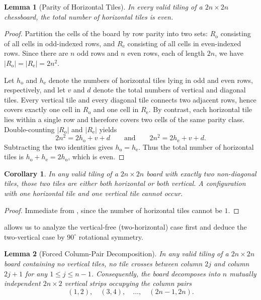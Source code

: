 \documentclass[11pt,a4paper]{article}
\theoremstyle{paperthm}
\newtheorem{lemma}{Lemma}
\newtheorem{corollary}{Corollary}
\theoremstyle{paperdef}
\begin{document}
\begin{lemma}[Parity of Horizontal Tiles]
  \label{lem:parity}
  In every valid tiling of a $2n \times 2n$ chessboard, the total number of horizontal tiles is even.
\end{lemma}

\begin{proof}
  Partition the cells of the board by row parity into two sets: $R_{\mathrm{o}}$ consisting of all cells in odd-indexed rows, and $R_{\mathrm{e}}$ consisting of all cells in even-indexed rows. Since there are $n$ odd rows and $n$ even rows, each of length $2n$, we have $|R_{\mathrm{o}}| = |R_{\mathrm{e}}| = 2n^2$.

  Let $h_{\mathrm{o}}$ and $h_{\mathrm{e}}$ denote the numbers of horizontal tiles lying in odd and even rows, respectively, and let $v$ and $d$ denote the total numbers of vertical and diagonal tiles. Every vertical tile and every diagonal tile connects two adjacent rows, hence covers exactly one cell in $R_{\mathrm{o}}$ and one cell in $R_{\mathrm{e}}$. By contrast, each horizontal tile lies within a single row and therefore covers two cells of the same parity class. Double-counting $|R_{\mathrm{o}}|$ and $|R_{\mathrm{e}}|$ yields
  \[
    2n^2 = 2h_{\mathrm{o}} + v + d
    \qquad\text{and}\qquad
    2n^2 = 2h_{\mathrm{e}} + v + d.
  \]
  Subtracting the two identities gives $h_{\mathrm{o}} = h_{\mathrm{e}}$. Thus the total number of horizontal tiles is $h_{\mathrm{o}} + h_{\mathrm{e}} = 2h_{\mathrm{o}}$, which is even.
\end{proof}

\begin{corollary}
  \label{cor:dichotomy}
  In any valid tiling of a $2n \times 2n$ board with exactly two non-diagonal tiles, those two tiles are either \emph{both horizontal} or \emph{both vertical}. A configuration with one horizontal tile and one vertical tile cannot occur.
\end{corollary}

\begin{proof}
  Immediate from , since the number of horizontal tiles cannot be $1$.
\end{proof}

 allows us to analyze the vertical-free (two-horizontal) case first and deduce the two-vertical case by $90^\circ$ rotational symmetry.

\begin{lemma}[Forced Column-Pair Decomposition]
  \label{lem:strips}
  In any valid tiling of a $2n \times 2n$ board containing no vertical tiles, no tile crosses between column $2j$ and column $2j+1$ for any $1 \le j \le n-1$. Consequently, the board decomposes into $n$ mutually independent $2n \times 2$ vertical strips occupying the column pairs
  \[
    (1,2),\quad (3,4),\quad \dots,\quad (2n-1, 2n).
  \]
\end{lemma}
\end{document}
